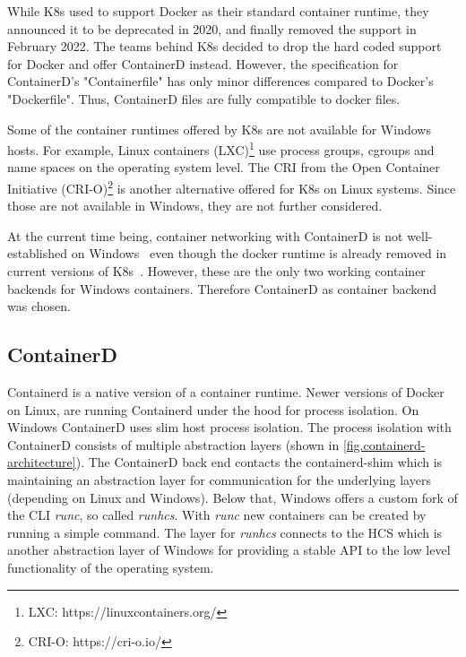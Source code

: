 While \ac{K8s} used to support Docker as their standard container runtime, they announced it to be deprecated in 2020, and finally removed the support in February 2022\cite{Kubernetes.2020, Kubernetes.2022}. The teams behind \ac{K8s} decided to drop the hard coded support for Docker and offer ContainerD instead.
However, the specification for ContainerD's "Containerfile" has only minor differences compared to Docker's "Dockerfile". Thus, ContainerD files are fully compatible to docker files.

Some of the container runtimes offered by \ac{K8s} are not available for \ac{Windows} hosts. For example, Linux containers (LXC)\footnote{LXC: https://linuxcontainers.org/} use process groups, \acp{cgroup} and name spaces on the operating system level.
The \ac{CRI} from the Open Container Initiative (CRI-O)\footnote{CRI-O: https://cri-o.io/} is another alternative offered for \ac{K8s} on Linux systems. Since those are not available in \ac{Windows}, they are not further considered.

At the current time being, container networking with ContainerD is not well-established on \ac{Windows}~\cite{GitHub.20230202,GitHub.20230202b,Github.2022_258,GitHub.20230202c} even though the docker runtime is already removed in current versions of \ac{K8s}~\cite{Kubernetes.2020}. However, these are the only two working container backends for \ac{Windows} containers. Therefore ContainerD as container backend was chosen.

\subsection{ContainerD}
Containerd is a native version of a container runtime. Newer versions of Docker on Linux, are running Containerd under the hood for process isolation. On \ac{Windows} ContainerD uses slim host process isolation.  The process isolation with ContainerD consists of multiple abstraction layers (shown in \autoref{fig.containerd-architecture}). The ContainerD back end contacts the containerd-shim which is maintaining an abstraction layer for communication for the underlying layers (depending on Linux and \ac{Windows}). Below that, \ac{Windows} offers a custom fork of the \ac{CLI} \textit{runc}, so called \textit{runhcs}\cite{Scooley.2022}. With \textit{runc} new containers can be created by running a simple command\cite{Scooley.2022}. The layer for \textit{runhcs} connects to the \ac{HCS} which is another abstraction layer of \ac{Windows} for providing a stable \ac{API} to the low level functionality of the operating system\cite{Microsoft.2017}.

